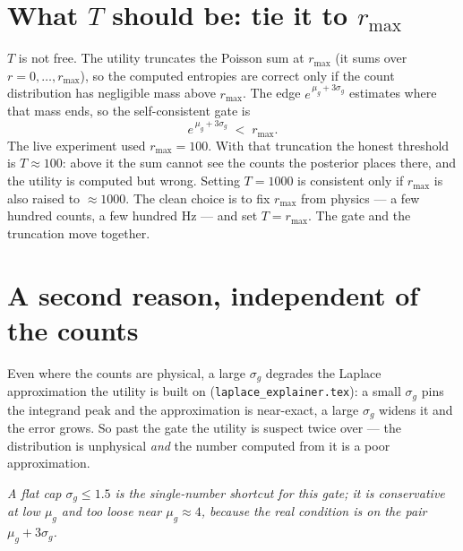 \documentclass[11pt]{article}
\begin{document}
\section{What $T$ should be: tie it to $r_{\max}$}
$T$ is not free. The utility truncates the Poisson sum at $r_{\max}$ (it sums over
$r=0,\dots,r_{\max}$), so the computed entropies are correct only if the count
distribution has negligible mass above $r_{\max}$. The edge
$e^{\,\mu_g+3\sigma_g}$ estimates where that mass ends, so the self-consistent gate
is
\[
e^{\,\mu_g+3\sigma_g}\;<\;r_{\max}.
\]
The live experiment used $r_{\max}=100$. With that truncation the honest threshold
is $T\approx 100$: above it the sum cannot see the counts the posterior places
there, and the utility is computed but wrong. Setting $T=1000$ is consistent only
if $r_{\max}$ is also raised to ${\approx}1000$. The clean choice is to fix
$r_{\max}$ from physics --- a few hundred counts, a few hundred Hz --- and set
$T=r_{\max}$. The gate and the truncation move together.

\section{A second reason, independent of the counts}
Even where the counts are physical, a large $\sigma_g$ degrades the Laplace
approximation the utility is built on (\texttt{laplace\_explainer.tex}): a small
$\sigma_g$ pins the integrand peak and the approximation is near-exact, a large
$\sigma_g$ widens it and the error grows. So past the gate the utility is suspect
twice over --- the distribution is unphysical \emph{and} the number computed from
it is a poor approximation.

\medskip
\noindent\textit{A flat cap $\sigma_g\le 1.5$ is the single-number shortcut for
this gate; it is conservative at low $\mu_g$ and too loose near $\mu_g\approx 4$,
because the real condition is on the pair $\mu_g+3\sigma_g$.}
\end{document}
